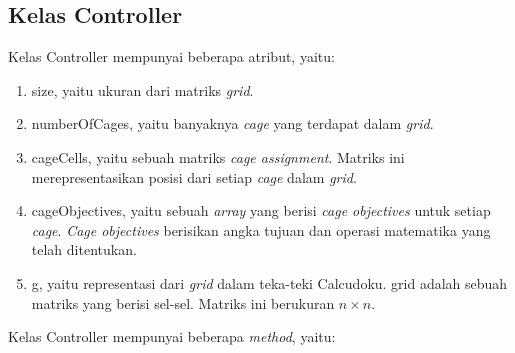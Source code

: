 \subsection{Kelas Controller}
\label{sec:kelascontroller}

Kelas Controller mempunyai beberapa atribut, yaitu:

\begin{enumerate}
\item size, yaitu ukuran dari matriks \textit{grid}.
\item numberOfCages, yaitu banyaknya \textit{cage} yang terdapat dalam \textit{grid}.
\item cageCells, yaitu sebuah matriks \textit{cage assignment}. Matriks ini merepresentasikan posisi dari setiap \textit{cage} dalam \textit{grid}.
\item cageObjectives, yaitu sebuah \textit{array} yang berisi \textit{cage objectives} untuk setiap \textit{cage}. \textit{Cage objectives} berisikan angka tujuan dan operasi matematika yang telah ditentukan.
\item g, yaitu representasi dari \textit{grid} dalam teka-teki Calcudoku. grid adalah sebuah matriks yang berisi sel-sel. Matriks ini berukuran \begin{math} n \times n\end{math}.
\end{enumerate}

Kelas Controller mempunyai beberapa \textit{method}, yaitu:

